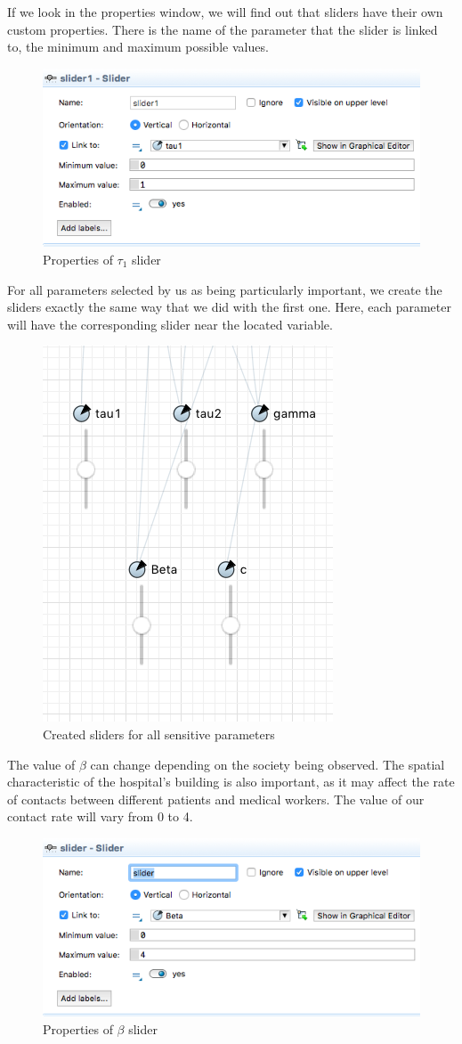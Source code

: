 If we look in the properties window, we will find out that sliders have their own custom properties. There is the name of the parameter that the slider is linked to, the minimum and maximum possible values.

\begin{figure}[H]
  \centering
  \includegraphics[height=0.3\textwidth]{img/screens/sliders/sliders7}
  \caption{Properties of $\tau_1$ slider}
\end{figure}

For all parameters selected by us as being particularly important, we create the sliders exactly the same way that we did with the first one. Here, each parameter will have the corresponding slider near the located variable.

\begin{figure}[H]
  \centering
  \includegraphics[height=0.5\textwidth]{img/screens/sliders/sliders3}
  \caption{Created sliders for all sensitive parameters}
\end{figure}

The value of $\beta$ can change depending on the society being observed. The spatial characteristic of the hospital's building is also important, as it may affect the rate of contacts between different patients and medical workers. The value of our contact rate will vary from 0 to 4.

\begin{figure}[H]
  \centering
  \includegraphics[height=0.3\textwidth]{img/screens/sliders/sliders6}
  \caption{Properties of $\beta$ slider}
\end{figure}

